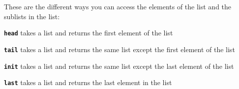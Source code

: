 These are the different ways you can access the elements of the list and
the sublists in the list:

\textbf{\texttt{head}} takes a list and returns the first element of the
list

\begin{Shaded}
\begin{Highlighting}[]
\OperatorTok{\textgreater{}} \NormalTok{ [}\NormalTok{,}\NormalTok{,}\NormalTok{,}\NormalTok{,}\NormalTok{]}
\end{Highlighting}
\end{Shaded}

\textbf{\texttt{tail}} takes a list and returns the same list except the
first element of the list

\begin{Shaded}
\begin{Highlighting}[]
\OperatorTok{\textgreater{}} \NormalTok{ [}\NormalTok{,}\NormalTok{,}\NormalTok{,}\NormalTok{,}\NormalTok{]}
\NormalTok{[}\NormalTok{,}\NormalTok{,}\NormalTok{,}\NormalTok{]}
\end{Highlighting}
\end{Shaded}

\textbf{\texttt{init}} takes a list and returns the same list except the
last element of the list

\begin{Shaded}
\begin{Highlighting}[]
\OperatorTok{\textgreater{}} \NormalTok{ [}\NormalTok{,}\NormalTok{,}\NormalTok{,}\NormalTok{,}\NormalTok{]}
\NormalTok{[}\NormalTok{,}\NormalTok{,}\NormalTok{,}\NormalTok{]}
\end{Highlighting}
\end{Shaded}

\textbf{\texttt{last}} takes a list and returns the last element in the
list

\begin{Shaded}
\begin{Highlighting}[]
\OperatorTok{\textgreater{}} \NormalTok{ [}\NormalTok{,}\NormalTok{,}\NormalTok{,}\NormalTok{,}\NormalTok{]}
\end{Highlighting}
\end{Shaded}

